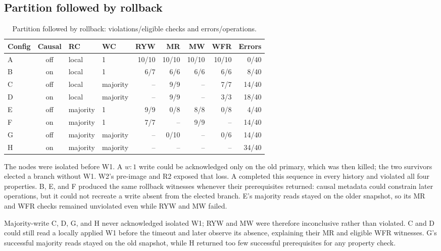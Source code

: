 \documentclass[11pt,a4paper]{article}
\begin{document}
\subsection{Partition followed by rollback}
\begin{table}[H]
\centering\scriptsize
\caption{Partition followed by rollback: violations/eligible checks and errors/operations.}
\begin{tabular}{@{}lcllrrrrr@{}}
\toprule Config & Causal & RC & WC & RYW & MR & MW & WFR & Errors\\ \midrule
A & off & local & 1 & 10/10 & 10/10 & 10/10 & 10/10 & 0/40\\
B & on  & local & 1 & 6/7 & 6/6 & 6/6 & 6/6 & 8/40\\
C & off & local & majority & -- & 9/9 & -- & 7/7 & 14/40\\
D & on  & local & majority & -- & 9/9 & -- & 3/3 & 18/40\\
E & off & majority & 1 & 9/9 & 0/8 & 8/8 & 0/8 & 4/40\\
F & on  & majority & 1 & 7/7 & -- & 9/9 & -- & 14/40\\
G & off & majority & majority & -- & 0/10 & -- & 0/6 & 14/40\\
H & on  & majority & majority & -- & -- & -- & -- & 34/40\\ \bottomrule
\end{tabular}
\end{table}

The nodes were isolated before W1. A $w:1$ write could be acknowledged only on the old
primary, which was then killed; the two survivors elected a branch without W1. W2's pre-image
and R2 exposed that loss. A completed this sequence in every history and violated all four
properties. B, E, and F produced the same rollback witnesses whenever their prerequisites
returned: causal metadata could constrain later operations, but it could not recreate a
write absent from the elected branch. E's majority reads stayed on the older snapshot, so its
MR and WFR checks remained unviolated even while RYW and MW failed.

Majority-write C, D, G, and H never acknowledged isolated W1; RYW and MW were therefore
inconclusive rather than violated. C and D could still read a locally applied W1 before the
timeout and later observe its absence, explaining their MR and eligible WFR witnesses. G's
successful majority reads stayed on the old snapshot, while H returned too few successful
prerequisites for any property check.
\end{document}
